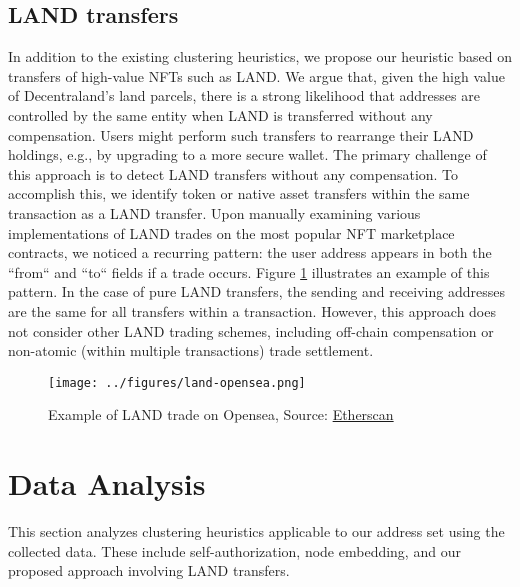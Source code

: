 \documentclass[12pt,a4paper,titlepage,oneside,english]{article}
\begin{document}
\subsection{LAND transfers}
In addition to the existing clustering heuristics, we propose our heuristic based on transfers of high-value NFTs such as LAND. We argue that, given the high value of Decentraland's land parcels, there is a strong likelihood that addresses are controlled by the same entity when LAND is transferred without any compensation. Users might perform such transfers to rearrange their LAND holdings, e.g., by upgrading to a more secure wallet. \newline
The primary challenge of this approach is to detect LAND transfers without any compensation. To accomplish this, we identify token or native asset transfers within the same transaction as a LAND transfer. Upon manually examining various implementations of LAND trades on the most popular NFT marketplace contracts, we noticed a recurring pattern: the user address appears in both the ``from`` and ``to`` fields if a trade occurs. Figure \ref{fig:LAND_example} illustrates an example of this pattern. 
In the case of pure LAND transfers, the sending and receiving addresses are the same for all transfers within a transaction. However, this approach does not consider other LAND trading schemes, including off-chain compensation or non-atomic (within multiple transactions) trade settlement.

\begin{figure}[h!]
	\centering
	\texttt{[image: ../figures/land-opensea.png]}
	\caption{Example of LAND trade on Opensea, Source: \href{https://etherscan.io/tx/0x2c2a70114e9080596bf5da6ad9c9b9f6d7e4c85a9d3b06e992f7248f9457a2ec}{Etherscan}}
	\label{fig:LAND_example}
\end{figure}


\section{Data Analysis}
This section analyzes clustering heuristics applicable to our address set using the collected data. These include self-authorization, node embedding, and our proposed approach involving LAND transfers.
\end{document}
